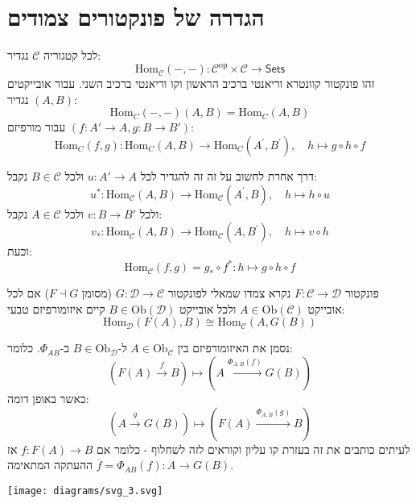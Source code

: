 \documentclass{tstextbook}
\begin{document}
\section{הגדרה של פונקטורים צמודים}

\begin{definition}
לכל קטגוריה \(\mathcal{C}\) נגדיר:
$$\mathrm{Hom}_{\mathcal{C}}(-,-):\mathcal{C} ^{\text{op}}\times \mathcal{C} \to \mathsf{Sets}$$
זהו פונקטור קוונטרא וריאנטי ברכיב הראשון וקו וריאנטי ברכיב השני. עבור אובייקטים \((A,B)\) נגדיר:
$$\mathrm{Hom}_{C}(-,-)(A,B)=\mathrm{Hom}_{C}(A,B)$$
עבור מורפיזם \(\left( f:A'\to A,g:B\to B' \right)\):
$$\mathrm{Hom}_{C}(f,g):\mathrm{Hom}_{C}(A,B)\to\mathrm{Hom}_{C}(A^{\prime},B^{\prime}),\quad h\mapsto g\circ h\circ f$$

\end{definition}
\begin{remark}
דרך אחרת לחשוב על זה זה להגדיר לכל \(u:A'\to A\) ולכל \(B \in \mathcal{C}\) נקבל:
$$u^{*}:{\mathrm{Hom}}_{\mathcal{C} }(A,B)\to{\mathrm{Hom}}_{\mathcal{C} }\left( A^{\prime},B \right),\quad h\mapsto h\circ u$$
ולכל \(v:B\to B'\) ולכל \(A \in \mathcal{C}\) נקבל:
$$v_{*}:\mathrm{Hom}_{\mathcal{C} }(A,B)\to\mathrm{Hom}_{\mathcal{C} }\left( A,B^{\prime} \right),\quad h\mapsto v\circ h$$
וכעת:
$$\mathrm{Hom}_{\mathcal{C} }(f,g)=g_{*}\circ f^{*}:h\mapsto g\circ h\circ f$$

\end{remark}
\begin{definition}[צמוד]
פונקטור \(F: \mathcal{C} \to \mathcal{D}\) נקרא צמדו שמאלי לפונקטור \(G: \mathcal{D} \to \mathcal{C}\) (מסומן \(F \dashv G\)) אם לכל אובייקט \(A \in \mathrm{Ob}(\mathcal{C})\) ולכל אובייקט \(B \in \mathrm{Ob}(\mathcal{D})\) קיים איזומורפיזם טבעי:
$$\mathrm{Hom}_{\mathcal{D} }(F(A),B)\cong  \mathrm{Hom}_{\mathcal{C} }(A,G(B))$$

\end{definition}
\begin{symbolize}
נסמן את האיזומורפיזם בין \(A\in \mathrm{Ob}_{\mathcal{C}}\) ל-\(B\in \mathrm{Ob}_{\mathcal{D}}\) ב-\(\Phi_{AB}\). כלומר:
$$(F(A)\xrightarrow{f}B)\mapsto(A\xrightarrow{\Phi_{A,B}(f)}G(B))$$
כאשר באופן דומה:
$$(A\xrightarrow{g} G(B))\mapsto(F(A)\xrightarrow{\Phi_{A,B}(g)}B)$$
לעיתים כותבים את זה בעזרת קו עליון וקוראים לזה לשחלוף - כלומר אם \(f:F(A)\to B\) אז \(\overline{f}=\Phi_{AB}(f):A\to G(B)\) ההעתקה המתאימה.

\end{symbolize}
\texttt{[image: diagrams/svg\_3.svg]}
\end{document}

